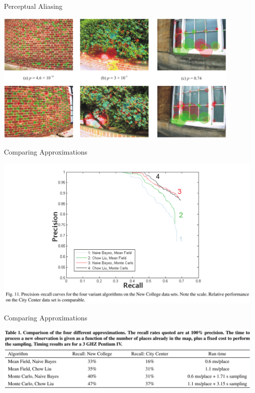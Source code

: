 \begin{frame}{Perceptual Aliasing}
    \begin{center}
        \includegraphics[width=0.9\textwidth]{./media/perceptual_aliasing.png}
    \end{center}
\end{frame}

\begin{frame}{Comparing Approximations}
    \begin{center}
        \includegraphics[width=\textwidth]{./media/compare_fig.png}
    \end{center}
\end{frame}

\begin{frame}{Comparing Approximations}
    \begin{center}
        \includegraphics[width=\textwidth]{./media/table.png}
    \end{center}
\end{frame}
